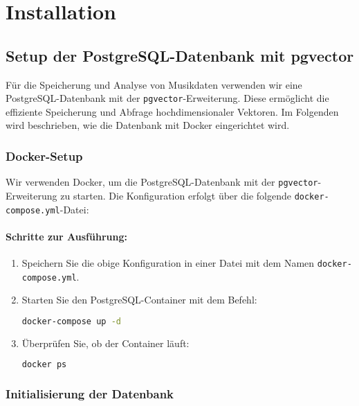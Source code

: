 \section{Installation}

\subsection{Setup der PostgreSQL-Datenbank mit pgvector}

Für die Speicherung und Analyse von Musikdaten verwenden wir eine PostgreSQL-Datenbank mit der \texttt{pgvector}-Erweiterung. Diese ermöglicht die effiziente Speicherung und Abfrage hochdimensionaler Vektoren. Im Folgenden wird beschrieben, wie die Datenbank mit Docker eingerichtet wird.

\subsubsection{Docker-Setup}

Wir verwenden Docker, um die PostgreSQL-Datenbank mit der \texttt{pgvector}-Erweiterung zu starten. Die Konfiguration erfolgt über die folgende \texttt{docker-compose.yml}-Datei:




\paragraph{Schritte zur Ausführung:}
\begin{enumerate}
    \item Speichern Sie die obige Konfiguration in einer Datei mit dem Namen \texttt{docker-compose.yml}.
    \item Starten Sie den PostgreSQL-Container mit dem Befehl:
    \begin{lstlisting}[language=bash]
    docker-compose up -d
    \end{lstlisting}
    \item Überprüfen Sie, ob der Container läuft:
    \begin{lstlisting}[language=bash]
    docker ps
    \end{lstlisting}
\end{enumerate}

\subsubsection{Initialisierung der Datenbank}

